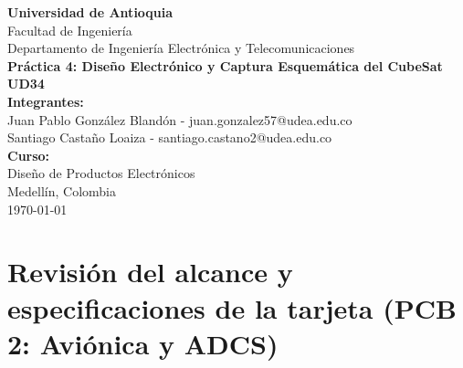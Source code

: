 \documentclass[11pt,a4paper]{article}
\begin{document}
\begin{titlepage}
    \centering
    \vspace*{2cm}
    {\Huge \textbf{\color{udacolor} Universidad de Antioquia}}\\[0.5cm]
    {\LARGE Facultad de Ingeniería}\\[0.5cm]
    {\Large Departamento de Ingeniería Electrónica y Telecomunicaciones}\\[2cm]
    
    {\huge \textbf{Práctica 4: Diseño Electrónico y Captura Esquemática del CubeSat UD34}}\\[2cm]
    
    {\Large \textbf{Integrantes:}}\\[0.5cm]
    {\large Juan Pablo González Blandón - juan.gonzalez57@udea.edu.co}\\[0.2cm]
    {\large Santiago Castaño Loaiza - santiago.castano2@udea.edu.co}\\[2cm]
    
    {\Large \textbf{Curso:}}\\[0.5cm]
    {\large Diseño de Productos Electrónicos}\\[2cm]
    
    \vfill
    {\large Medellín, Colombia}\\[0.2cm]
    {\large \today}
\end{titlepage}

\tableofcontents
\newpage

\section{Revisión del alcance y especificaciones de la tarjeta (PCB 2: Aviónica y ADCS)}
\end{document}
